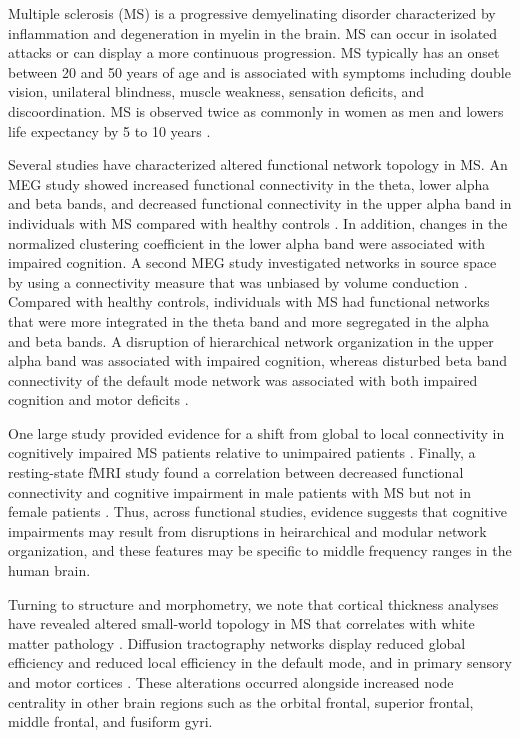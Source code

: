 \documentclass[12pt]{article}
\begin{document}
Multiple sclerosis (MS) is a progressive demyelinating disorder characterized by inflammation and degeneration in myelin in the brain. MS can occur in isolated attacks or can display a more continuous progression. MS typically has an onset between 20 and 50 years of age and is associated with symptoms including double vision, unilateral blindness, muscle weakness, sensation deficits, and discoordination. MS is observed twice as commonly in women as men and lowers life expectancy by 5 to 10 years \cite{goldenberg2012multiple}.

Several studies have characterized altered functional network topology in MS. An MEG study showed increased functional connectivity in the theta, lower alpha and beta bands, and decreased functional connectivity in the upper alpha band in individuals with MS compared with healthy controls \cite{schoonheim2013functional}. In addition, changes in the normalized clustering coefficient in the lower alpha band were associated with impaired cognition. A second MEG study investigated networks in source space by using a connectivity measure that was unbiased by volume conduction \cite{tewarie2013cognitive}. Compared with healthy controls, individuals with MS had functional networks that were more integrated in the theta band and more segregated in the alpha and beta bands. A disruption of hierarchical network organization in the upper alpha band was associated with impaired cognition, whereas disturbed beta band connectivity of the default mode network was associated with both impaired cognition and motor deficits \cite{tewarie2013cognitive}. 

One large study provided evidence for a shift from global to local connectivity in cognitively impaired MS patients relative to unimpaired patients \cite{van2014graph}. Finally, a resting-state fMRI study found a correlation between decreased functional connectivity and cognitive impairment in male patients with MS but not in female patients \cite{schoonheim2013functional}. Thus, across functional studies, evidence suggests that cognitive impairments may result from disruptions in heirarchical and modular network organization, and these features may be specific to middle frequency ranges in the human brain.

Turning to structure and morphometry, we note that cortical thickness analyses have revealed altered small-world topology in MS that correlates with white matter pathology \cite{he2009impaired}. Diffusion tractography networks display reduced global efficiency and reduced local efficiency in the default mode, and in primary sensory and motor cortices \cite{shu2011diffusion}. These alterations occurred alongside increased node centrality in other brain regions such as the orbital frontal, superior frontal, middle frontal, and fusiform gyri.
\end{document}
